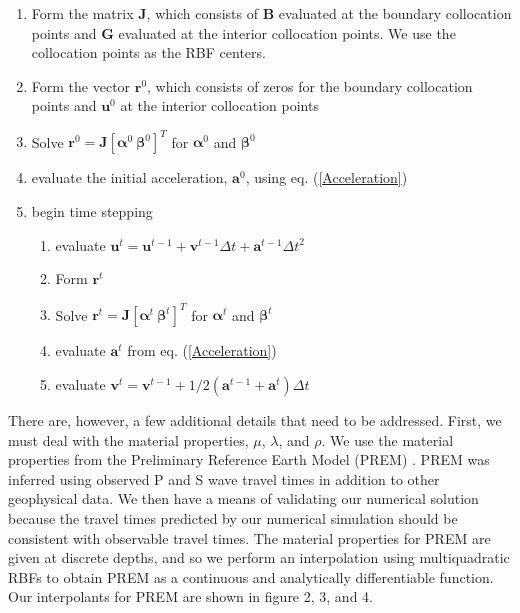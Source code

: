 \documentclass[12pt]{article}
\begin{document}
\begin{enumerate}
\item Form the matrix $\boldsymbol{J}$, which consists of
  $\boldsymbol{B}$ evaluated at the boundary collocation points and
  $\boldsymbol{G}$ evaluated at the interior collocation points. We
  use the collocation points as the RBF centers.
\item Form the vector $\boldsymbol{r}^0$, which consists of zeros for
  the boundary collocation points and $\boldsymbol{u}^{0}$ at the interior collocation points 
\item Solve $\boldsymbol{r}^0=\boldsymbol{J}[\boldsymbol{\alpha}^0\ \boldsymbol{\beta}^0]^T$ for
  $\boldsymbol{\alpha}^0$ and $\boldsymbol{\beta}^0$
\item evaluate the initial acceleration, $\boldsymbol{a}^0$, using eq. (\ref{Acceleration}) 
\item begin time stepping 
\begin{enumerate}
\item evaluate $\boldsymbol{u}^{t}=\boldsymbol{u}^{t-1} + 
                                  \boldsymbol{v}^{t-1}\Delta t + 
                                  \boldsymbol{a}^{t-1}\Delta t^2$
\item Form $\boldsymbol{r}^t$
\item Solve $\boldsymbol{r}^t=\boldsymbol{J}[\boldsymbol{\alpha}^t\ \boldsymbol{\beta}^t]^T$ for
  $\boldsymbol{\alpha}^t$ and $\boldsymbol{\beta}^t$
\item evaluate $\boldsymbol{a}^t$ from eq. (\ref{Acceleration})
\item evaluate $\boldsymbol{v}^t = \boldsymbol{v}^{t-1} +
  1/2(\boldsymbol{a}^{t-1} + \boldsymbol{a}^t)\Delta t$
\end{enumerate} 
\end{enumerate} 

There are, however, a few additional details that need to be
addressed.  First, we must deal with the material properties, $\mu$,
$\lambda$, and $\rho$.  We use the material properties from the
Preliminary Reference Earth Model (PREM) \citep{D1981}.  PREM was
inferred using observed P and S wave travel times in addition to other
geophysical data.  We then have a means of validating our numerical
solution because the travel times predicted by our numerical
simulation should be consistent with observable travel times.  The
material properties for PREM are given at discrete depths, and so we
perform an interpolation using multiquadratic RBFs to obtain PREM as a
continuous and analytically differentiable function.  Our interpolants
for PREM are shown in figure 2, 3, and 4.
\end{document}
